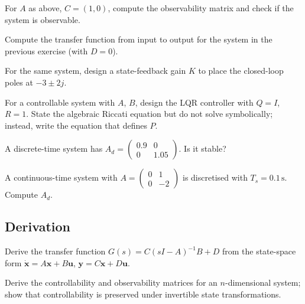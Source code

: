 \begin{exercise}
For $A$ as above, $C = (1, 0)$, compute the observability matrix and check if the system is observable.
\end{exercise}

\begin{exercise}
Compute the transfer function from input to output for the system in the previous exercise (with $D = 0$).
\end{exercise}

\begin{exercise}
For the same system, design a state-feedback gain $K$ to place the closed-loop poles at $-3 \pm 2j$.
\end{exercise}

\begin{exercise}
For a controllable system with $A$, $B$, design the LQR controller with $Q = I$, $R = 1$. State the algebraic Riccati equation but do not solve symbolically; instead, write the equation that defines $P$.
\end{exercise}

\begin{exercise}
A discrete-time system has $A_d = \begin{pmatrix} 0.9 & 0 \\ 0 & 1.05 \end{pmatrix}$. Is it stable?
\end{exercise}

\begin{exercise}
A continuous-time system with $A = \begin{pmatrix} 0 & 1 \\ 0 & -2 \end{pmatrix}$ is discretised with $T_s = 0.1\,\text{s}$. Compute $A_d$.
\end{exercise}

\subsection*{Derivation}

\begin{exercise}
Derive the transfer function $G(s) = C(sI - A)^{-1}B + D$ from the state-space form $\dot{\mathbf{x}} = A\mathbf{x} + B\mathbf{u}$, $\mathbf{y} = C\mathbf{x} + D\mathbf{u}$.
\end{exercise}

\begin{exercise}
Derive the controllability and observability matrices for an $n$-dimensional system; show that controllability is preserved under invertible state transformations.
\end{exercise}

